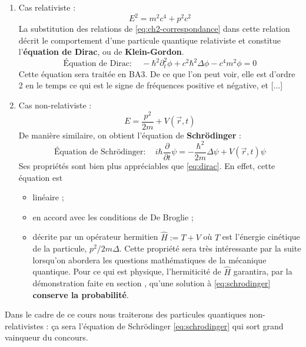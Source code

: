 \documentclass[12pt, a4paper]{book}
\begin{document}
\begin{enumerate}[label =  (\alph*)]
\begin{enumerate}[label = \roman*)]
\item Cas relativiste : 
$$E^2 = m^2 c^4 + p^2 c^2$$
La substitution des relations de \eqref{eq:ch2-correspondance} dans cette relation décrit le comportement d'une particule quantique relativiste et constitue l'\textbf{équation de Dirac}, ou de \textbf{Klein-Gordon}.
\begin{equation} \label{eq:dirac}
\boxed{\text{Équation de Dirac} : \quad -\hbar ^2 \partial_t ^2 \phi + c^2 \hbar ^2 \Delta \phi - c^4 m^2 \phi = 0}
\end{equation}
Cette équation sera traitée en BA3. De ce que l'on peut voir, elle est d'ordre 2 en le temps ce qui est le signe de fréquences positive et négative, et [...]
\item Cas non-relativiste :
$$E = \dfrac{p^2}{2m} + V(\vec r, t)$$
De manière similaire, on obtient l'équation de \textbf{Schrödinger} :
\begin{equation} \label{eq:schrodinger}
\boxed{\text{Équation de Schrödinger} : \quad
i\hbar \dfrac{\partial}{\partial t} \psi = -\dfrac{\hbar ^2}{2m} \Delta \psi + V(\vec r, t) \psi}
\end{equation}
Ses propriétés sont bien plus appréciables que \eqref{eq:dirac}. En effet, cette équation est 
\begin{itemize}
\item linéaire ;
\item en accord avec les conditions de De Broglie ;
\item décrite par un opérateur hermitien $\hat{H} := T + V$ où $T$ est l'énergie cinétique de la particule, $p^2/2m \Delta$. Cette propriété sera très intéressante par la suite lorsqu'on abordera les questions mathématiques de la mécanique quantique. Pour ce qui est physique, l'hermiticité de $ \hat{H}$ garantira, par la démonstration faite en section \textbf{}, qu'une solution à \eqref{eq:schrodinger} \textbf{conserve la probabilité}.
\end{itemize}
\end{enumerate}
\end{enumerate}
Dans le cadre de ce cours nous traiterons des particules quantiques non-relativistes : ça sera l'équation de Schrödinger \eqref{eq:schrodinger} qui sort grand vainqueur du concours.

\end{document}
